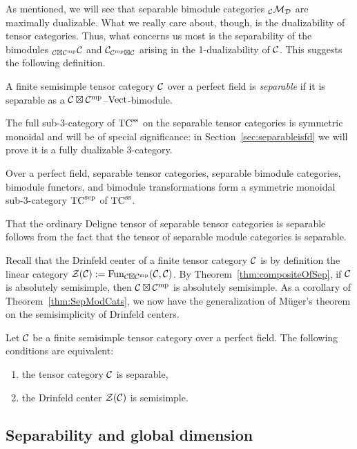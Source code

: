 \documentclass{amsart}
\begin{document}
As mentioned, we will see that separable bimodule categories ${}_\mathcal C \mathcal M_\mathcal D$ are maximally dualizable.  What we really care about, though, is the dualizability of tensor categories.  Thus, what concerns us most is the separability of the bimodules ${}_{\mathcal C \boxtimes \mathcal C^{\mathrm{mp}}} \mathcal C$ and $\mathcal C_{\mathcal C^{\mathrm{mp}} \boxtimes \mathcal C}$ arising in the 1-dualizability of $\mathcal C$.  This suggests the following definition.
\begin{definition}
A finite semisimple tensor category $\mathcal C$ over a perfect field is \emph{separable} if it is separable as a $\mathcal C \boxtimes \mathcal C^{\mathrm{mp}}$--$\mathrm{Vect}$-bimodule.
\end{definition}
\nid The full sub-3-category of ${\mathrm{TC}^{\mathrm{ss}}}$ on the separable tensor categories is symmetric monoidal and will be of special significance: in Section~\ref{sec:separableisfd} we will prove it is a fully dualizable 3-category. 
\begin{corollary} \label{cor:tcsepexists}
Over a perfect field, separable tensor categories, separable bimodule categories, bimodule functors, and bimodule transformations form a symmetric monoidal sub-3-category ${\mathrm{TC}^{\mathrm{sep}}}$ of ${\mathrm{TC}^{\mathrm{ss}}}$.
\end{corollary}
\nid That the ordinary Deligne tensor of separable tensor categories is separable follows from the fact that the tensor of separable module categories is separable.

Recall that the Drinfeld center of a finite tensor category $\mathcal C$ is by definition the linear category $\mathcal Z(\mathcal C) := \operatorname{Fun}_{\mathcal C \boxtimes \mathcal C^{\mathrm{mp}}}(\mathcal C,\mathcal C)$.  By Theorem~\ref{thm:compositeOfSep}, if $\mathcal C$ is absolutely semisimple, then $\mathcal C \boxtimes \mathcal C^{\mathrm{mp}}$ is absolutely semisimple.  As a corollary of Theorem~\ref{thm:SepModCats}, we now have the generalization of M\"uger's theorem on the semisimplicity of Drinfeld centers.
\begin{corollary} \label{cor:Sep=semisimplecenter}
Let $\mathcal C$ be a finite semisimple tensor category over a perfect field.  The following conditions are equivalent:
\begin{enumerate}
\item the tensor category $\mathcal C$ is separable,
\item the Drinfeld center $\mathcal Z(\mathcal C)$ is semisimple.
\end{enumerate}
\end{corollary}


\subsection{Separability and global dimension} \label{sec:tc-fusion}
\end{document}
